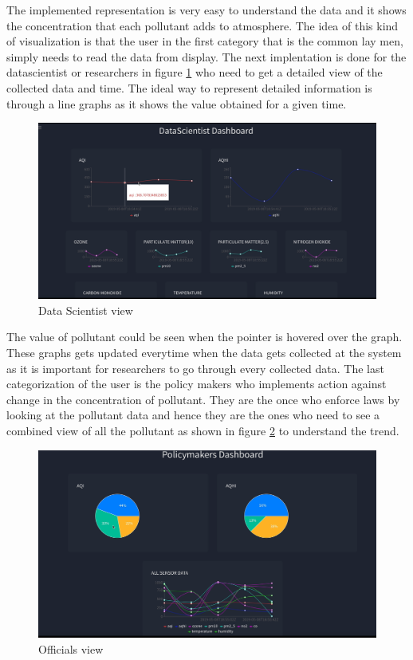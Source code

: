 The implemented representation is very easy to understand the data and it shows the concentration that each pollutant adds to atmosphere. The idea of this kind of visualization is that the user in the first category that is the common lay men, simply needs to read the data from display.
The next implentation is done for the  datascientist or researchers in figure \ref{view2} who need to get a detailed view of the collected data and time. The ideal way to represent detailed information is through a line graphs as it shows the value obtained for a given time. 

\begin{figure}[h]
  \begin{center}
  \includegraphics[scale=0.40]{./images/figure15.png}
  \end{center}
  \caption{Data Scientist view}
  \label{view2}
\end{figure}

The value of pollutant could be seen when the pointer is hovered over the graph. These graphs gets updated everytime when the data gets collected at the system as it is important for researchers to go through every collected data. The last categorization of the user is the policy makers who implements action against change in the concentration of pollutant. They are the once who enforce laws by looking at the pollutant data and hence they are the ones who need to see a combined view of all the pollutant as shown in figure \ref{view3} to understand the trend.

\begin{figure}[h]
  \begin{center}
  \includegraphics[scale=0.45]{./images/figure16.png}
  \end{center}
  \caption{Officials view}
  \label{view3}
\end{figure}

